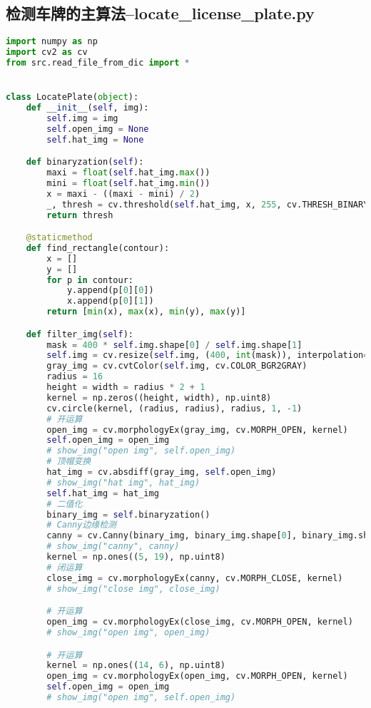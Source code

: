 \documentclass{hitreport}
\begin{document}
\newpage
\begin{appendices}

\section{检测车牌的主算法--locate\_license\_plate.py}\label{app:loc}
\begin{lstlisting}[language=python]
import numpy as np
import cv2 as cv
from src.read_file_from_dic import *


class LocatePlate(object):
    def __init__(self, img):
        self.img = img
        self.open_img = None
        self.hat_img = None

    def binaryzation(self):
        maxi = float(self.hat_img.max())
        mini = float(self.hat_img.min())
        x = maxi - ((maxi - mini) / 2)
        _, thresh = cv.threshold(self.hat_img, x, 255, cv.THRESH_BINARY)
        return thresh

    @staticmethod
    def find_rectangle(contour):
        x = []
        y = []
        for p in contour:
            y.append(p[0][0])
            x.append(p[0][1])
        return [min(x), max(x), min(y), max(y)]

    def filter_img(self):
        mask = 400 * self.img.shape[0] / self.img.shape[1]
        self.img = cv.resize(self.img, (400, int(mask)), interpolation=cv.INTER_AREA)
        gray_img = cv.cvtColor(self.img, cv.COLOR_BGR2GRAY)
        radius = 16
        height = width = radius * 2 + 1
        kernel = np.zeros((height, width), np.uint8)
        cv.circle(kernel, (radius, radius), radius, 1, -1)
        # 开运算
        open_img = cv.morphologyEx(gray_img, cv.MORPH_OPEN, kernel)
        self.open_img = open_img
        # show_img("open img", self.open_img)
        # 顶帽变换
        hat_img = cv.absdiff(gray_img, self.open_img)
        # show_img("hat img", hat_img)
        self.hat_img = hat_img
        # 二值化
        binary_img = self.binaryzation()
        # Canny边缘检测
        canny = cv.Canny(binary_img, binary_img.shape[0], binary_img.shape[1])
        # show_img("canny", canny)
        kernel = np.ones((5, 19), np.uint8)
        # 闭运算
        close_img = cv.morphologyEx(canny, cv.MORPH_CLOSE, kernel)
        # show_img("close img", close_img)

        # 开运算
        open_img = cv.morphologyEx(close_img, cv.MORPH_OPEN, kernel)
        # show_img("open img", open_img)

        # 开运算
        kernel = np.ones((14, 6), np.uint8)
        open_img = cv.morphologyEx(open_img, cv.MORPH_OPEN, kernel)
        self.open_img = open_img
        # show_img("open img", self.open_img)


\end{lstlisting}
\end{appendices}
\end{document}
